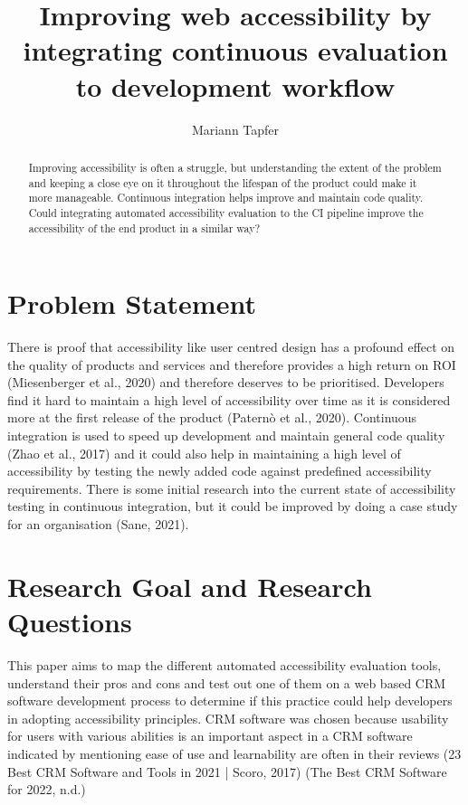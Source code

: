 \documentclass{thesis_proposal}
\title{Improving web accessibility by integrating continuous evaluation to development workflow}
\author{Mariann Tapfer}
\begin{document}
\maketitle

\begin{abstract}
    Improving accessibility is often a struggle, but understanding the extent of the problem and keeping a close eye on it throughout the lifespan of the product could make it more manageable. Continuous integration helps improve and maintain code quality. Could integrating automated accessibility evaluation to the CI pipeline improve the accessibility of the end product in a similar way?
\end{abstract}

\section{Problem Statement}
There is proof that accessibility like user centred design has a profound effect on the quality of products and services and therefore provides a high return on ROI  (Miesenberger et al., 2020) and therefore deserves to be prioritised. 
Developers find it hard to maintain a high level of accessibility over time as it is considered more at the first release of the product (Paternò et al., 2020). Continuous integration is used to speed up development and maintain general code quality (Zhao et al., 2017) and it could also help in maintaining a high level of accessibility by testing the newly added code against predefined accessibility requirements. There is some initial research into the current state of accessibility testing in continuous integration, but it could be improved by doing a case study for an organisation (Sane, 2021).

\section{Research Goal and Research Questions}
This paper aims to map the different automated accessibility evaluation tools, understand their pros and cons and test out one of them on a web based CRM software development process to determine if this practice could help developers in adopting accessibility principles. CRM software was chosen because usability for users with various abilities is an important aspect in a CRM software indicated by mentioning ease of use  and learnability are often in their reviews (23 Best CRM Software and Tools in 2021 | Scoro, 2017) (The Best CRM Software for 2022, n.d.) 
\end{document}
